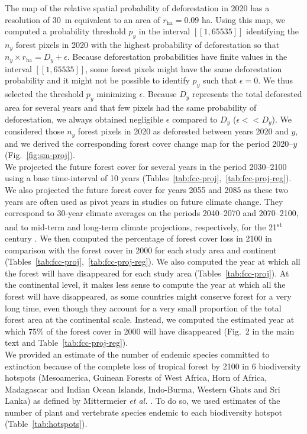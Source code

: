 \documentclass[
  12pt,
]{article}
\begin{document}
The map of the relative spatial probability of deforestation in 2020 has a resolution of 30~m equivalent to an area of \(r_{\text{ha}}=0.09\) ha. Using this map, we computed a probability threshold \(p_y\) in the interval \([\![1, 65535]\!]\) identifying the \(n_y\) forest pixels in 2020 with the highest probability of deforestation so that \(n_y \times r_{\text{ha}} = D_y + \epsilon\). Because deforestation probabilities have finite values in the interval \([\![1, 65535]\!]\), some forest pixels might have the same deforestation probability and it might not be possible to identify \(p_y\) such that \(\epsilon=0\). We thus selected the threshold \(p_y\) minimizing \(\epsilon\). Because \(D_y\) represents the total deforested area for several years and that few pixels had the same probability of deforestation, we always obtained negligible \(\epsilon\) compared to \(D_y\) (\(\epsilon << D_y\)). We considered those \(n_y\) forest pixels in 2020 as deforested between years 2020 and \(y\), and we derived the corresponding forest cover change map for the period 2020--\(y\) (Fig.~\ref{fig:sm-proj}).\\

We projected the future forest cover for several years in the period 2030--2100 using a base time-interval of 10 years (Tables~\ref{tab:fcc-proj},~\ref{tab:fcc-proj-reg}). We also projected the future forest cover for years 2055 and 2085 as these two years are often used as pivot years in studies on future climate change. They correspond to 30-year climate averages on the periods 2040--2070 and 2070--2100, and to mid-term and long-term climate projections, respectively, for the 21\textsuperscript{st} century \citep{IPCC2014}. We then computed the percentage of forest cover loss in 2100 in comparison with the forest cover in 2000 for each study area and continent (Tables~\ref{tab:fcc-proj},~\ref{tab:fcc-proj-reg}). We also computed the year at which all the forest will have disappeared for each study area (Tables~\ref{tab:fcc-proj}). At the continental level, it makes less sense to compute the year at which all the forest will have disappeared, as some countries might conserve forest for a very long time, even though they account for a very small proportion of the total forest area at the continental scale. Instead, we computed the estimated year at which 75\% of the forest cover in 2000 will have disappeared (Fig.~2 in the main text and Table~\ref{tab:fcc-proj-reg}).\\

We provided an estimate of the number of endemic species committed to extinction because of the complete loss of tropical forest by 2100 in 6 biodiversity hotspots (Mesoamerica, Guinean Forests of West Africa, Horn of Africa, Madagascar and Indian Ocean Islands, Indo-Burma, Western Ghats and Sri Lanka) as defined by Mittermeier \emph{et al.} \citep{Mittermeier2011}. To do so, we used estimates of the number of plant and vertebrate species endemic to each biodiversity hotspot (Table~\ref{tab:hotspots}).
\end{document}
